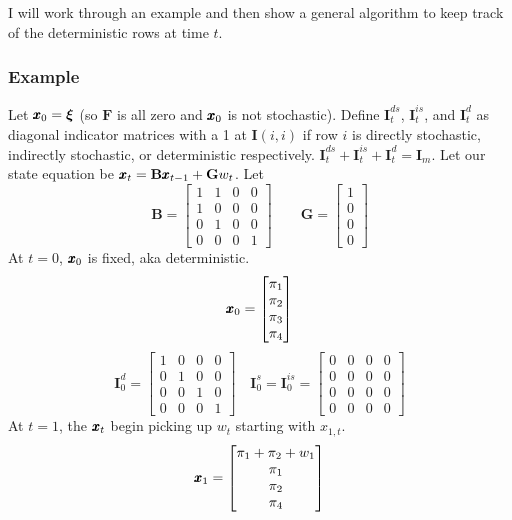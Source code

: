 \documentclass[]{article}
\def\xixi{\mbox{\boldmath $\xi$}}
\def\BB{\mbox{$\mathbf B$}}	\def\bb{\mbox{$\mathbf b$}}
\def\FF{\mbox{$\mathbf F$}} \def\ff{\mbox{$\mathbf f$}}
\def\GG{\mbox{$\mathbf G$}}	\def\gg{\mbox{$\mathbf g$}}
\def\II{\mbox{$\mathbf I$}} \def\ii{\mbox{$\mathbf i$}}
\begin{document}
I will work through an example and then show a general algorithm to keep track of the deterministic rows at time $t$.

\subsubsection*{Example}

Let $\xx_0=\xixi$ (so $\FF$ is all zero and $\mbox{$\pmb{x}$}_0$ is not stochastic).  Define $\II_t^{ds}$, $\II_t^{is}$, and $\II_t^d$ as diagonal indicator matrices with a 1 at $\II(i,i)$ if row $i$ is directly stochastic, indirectly stochastic, or deterministic respectively.  $\II_t^{ds}+\II_t^{is}+\II_t^d=\II_m$.  Let our state equation be $\xx_t=\BB\xx_{t-1}+\GG w_t$.
Let
\begin{equation}
\BB=\begin{bmatrix}
1&1&0&0\\
1&0&0&0\\
0&1&0&0\\
0&0&0&1
\end{bmatrix}\quad\quad
\GG=\begin{bmatrix}
1\\
0\\
0\\
0
\end{bmatrix}
\end{equation}
At $t=0$, $\mbox{$\pmb{x}$}_0$ is fixed, aka deterministic.
\begin{equation}
\mbox{$\pmb{x}$}_0=\begin{bmatrix}
\pi_1\\
\pi_2\\
\pi_3\\
\pi_4
\end{bmatrix}
\end{equation}
\begin{equation}
\II_0^d=\begin{bmatrix}
1&0&0&0\\
0&1&0&0\\
0&0&1&0\\
0&0&0&1
\end{bmatrix}
\quad
\II_0^s=\II_0^{is}=\begin{bmatrix}
0&0&0&0\\
0&0&0&0\\
0&0&0&0\\
0&0&0&0
\end{bmatrix}
\end{equation}
At $t=1$, the $\mbox{$\pmb{x}$}_t$ begin picking up $w_t$ starting with $x_{1,t}$.
\begin{equation}
\mbox{$\pmb{x}$}_1=\begin{bmatrix}
\pi_1+\pi_2+w_1\\
\pi_1\\
\pi_2\\
\pi_4
\end{bmatrix}
\end{equation}
\end{document}
